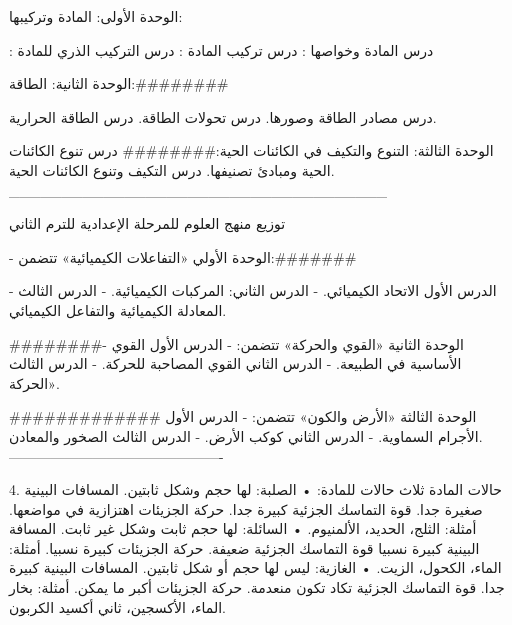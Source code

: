الوحدة الأولى: المادة وتركيبها:

: درس المادة وخواصها
: درس تركيب المادة
: درس التركيب الذري للمادة

الوحدة الثانية: الطاقة:########

درس مصادر الطاقة وصورها.
درس تحولات الطاقة.
 درس الطاقة الحرارية.

الوحدة الثالثة: التنوع والتكيف في الكائنات الحية:########
درس تنوع الكائنات الحية ومبادئ تصنيفها.
 درس التكيف وتنوع الكائنات الحية.
____________________________________

توزيع منهج العلوم للمرحلة الإعدادية للترم الثاني

- الوحدة الأولي «التفاعلات الكيميائية» تتضمن:#######

- الدرس الأول الاتحاد الكيميائي.
- الدرس الثاني: المركبات الكيميائية.
- الدرس الثالث المعادلة الكيميائية والتفاعل الكيميائي.

########- الوحدة الثانية «القوي والحركة» تتضمن:
- الدرس الأول القوي الأساسية في الطبيعة.
- الدرس الثاني القوي المصاحبة للحركة.
- الدرس الثالث الحركة».

############# الوحدة الثالثة «الأرض والكون» تتضمن:
- الدرس الأول الأجرام السماوية.
- الدرس الثاني كوكب الأرض.
- الدرس الثالث الصخور والمعادن.
----------------------------------------------

4. حالات المادة
ثلاث حالات للمادة:
• الصلبة:
 لها حجم وشكل ثابتين.
 المسافات البينية صغيرة جدا.
 قوة التماسك الجزئية كبيرة جدا.
 حركة الجزيئات اهتزازية في مواضعها.
 أمثلة: الثلج، الحديد، الألمنيوم.
• السائلة:
 لها حجم ثابت وشكل غير ثابت.
 المسافة البينية كبيرة نسبيا
 قوة التماسك الجزئية ضعيفة.
 حركة الجزيئات كبيرة نسبيا.
 أمثلة: الماء، الكحول، الزيت.
• الغازية:
 ليس لها حجم أو شكل ثابتين.
 المسافات البينية كبيرة جدا.
 قوة التماسك الجزئية تكاد تكون منعدمة.
 حركة الجزيئات أكبر ما يمكن.
 أمثلة: بخار الماء، الأكسجين، ثاني أكسيد الكربون.